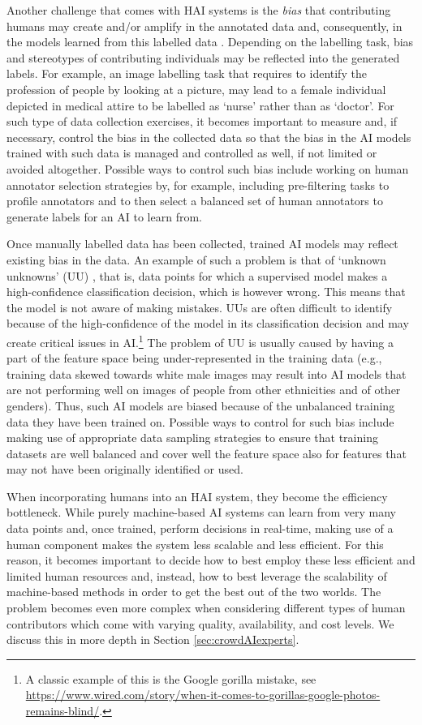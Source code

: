 \documentclass[11pt]{article}
\begin{document}
Another challenge that comes with HAI systems is the \textit{bias} that contributing humans may create and/or amplify in the annotated data and, consequently, in the models learned from this labelled data \cite{hajian2016algorithmic,olteanu2019social}.
Depending on the labelling task, bias and stereotypes of contributing individuals may be reflected into the generated labels. For example, an image labelling task that requires to identify the profession of people by looking at a picture, may lead to a female individual depicted in medical attire to be labelled as `nurse' rather than as `doctor'. For such type of data collection exercises, it becomes important to measure and, if necessary, control the bias in the collected data so that the bias in the AI models trained with such data is managed and controlled as well, if not limited or avoided altogether.
Possible ways to control such bias include working on human annotator selection strategies by, for example, including pre-filtering tasks to profile annotators and to then select a balanced set of human annotators to generate labels for an AI to learn from.


Once manually labelled data has been collected, trained AI models may reflect existing bias in the data. An example of such a problem is that of `unknown unknowns' (UU) \cite{uu}, that is, data points for which a supervised model makes a high-confidence classification decision, which is however wrong. This means that the model is not aware of making mistakes. UUs are often difficult to identify because of the high-confidence of the model in its classification decision and may create critical issues in AI.\footnote{A classic example of this is the Google gorilla mistake, see \url{https://www.wired.com/story/when-it-comes-to-gorillas-google-photos-remains-blind/}.} The problem of UU is usually caused by having a part of the feature space being under-represented in the training data (e.g., training data skewed towards white male images may result into AI models that are not performing well on images of people from other ethnicities and of other genders). Thus, such AI models are biased because of the unbalanced training data they have been trained on. Possible ways to control for such bias include making use of appropriate data sampling strategies to ensure that training datasets are well balanced and cover well the feature space also for features that may not have been originally identified or used.

When incorporating humans into an HAI system, they become the efficiency bottleneck. While purely machine-based AI systems can learn from very many data points and, once trained, perform decisions in real-time, making use of a human component makes the system less scalable and less efficient. For this reason, it becomes important to decide how to best employ these less efficient and limited human resources and, instead, how to best leverage the scalability of machine-based methods in order to get the best out of the two worlds. 
% 
The problem becomes even more complex when considering different types of human contributors which come with varying quality, availability, and cost levels. We discuss this in more depth in Section \ref{sec:crowdAIexperts}.
\end{document}
